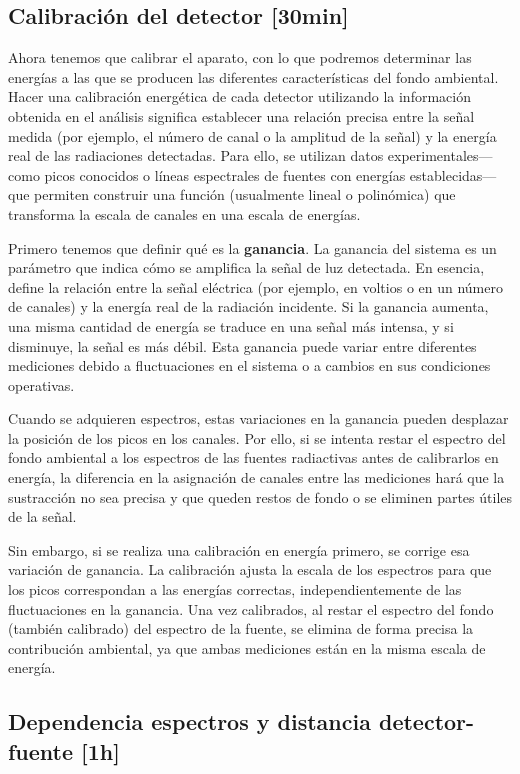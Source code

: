\documentclass[11pt]{article}
\begin{document}
\subsection{Calibración del detector [30min]}

Ahora tenemos que calibrar el aparato, con lo que podremos determinar las energías a las que se producen las diferentes características del fondo ambiental. Hacer una calibración energética de cada detector utilizando la información obtenida en el análisis significa establecer una relación precisa entre la señal medida (por ejemplo, el número de canal o la amplitud de la señal) y la energía real de las radiaciones detectadas. Para ello, se utilizan datos experimentales—como picos conocidos o líneas espectrales de fuentes con energías establecidas—que permiten construir una función (usualmente lineal o polinómica) que transforma la escala de canales en una escala de energías.

Primero tenemos que definir qué es la \textbf{ganancia}. La ganancia del sistema es un parámetro que indica cómo se amplifica la señal de luz detectada. En esencia, define la relación entre la señal eléctrica (por ejemplo, en voltios o en un número de canales) y la energía real de la radiación incidente. Si la ganancia aumenta, una misma cantidad de energía se traduce en una señal más intensa, y si disminuye, la señal es más débil. Esta ganancia puede variar entre diferentes mediciones debido a fluctuaciones en el sistema o a cambios en sus condiciones operativas.

Cuando se adquieren espectros, estas variaciones en la ganancia pueden desplazar la posición de los picos en los canales. Por ello, si se intenta restar el espectro del fondo ambiental a los espectros de las fuentes radiactivas antes de calibrarlos en energía, la diferencia en la asignación de canales entre las mediciones hará que la sustracción no sea precisa y que queden restos de fondo o se eliminen partes útiles de la señal.

Sin embargo, si se realiza una calibración en energía primero, se corrige esa variación de ganancia. La calibración ajusta la escala de los espectros para que los picos correspondan a las energías correctas, independientemente de las fluctuaciones en la ganancia. Una vez calibrados, al restar el espectro del fondo (también calibrado) del espectro de la fuente, se elimina de forma precisa la contribución ambiental, ya que ambas mediciones están en la misma escala de energía.


\subsection{Dependencia espectros y distancia detector-fuente [1h]}
\end{document}
